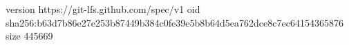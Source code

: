 version https://git-lfs.github.com/spec/v1
oid sha256:b63d7b86e27e253b87449b384c0fe39e5b8b64d5ea762dce8c7ec64154365876
size 445669
